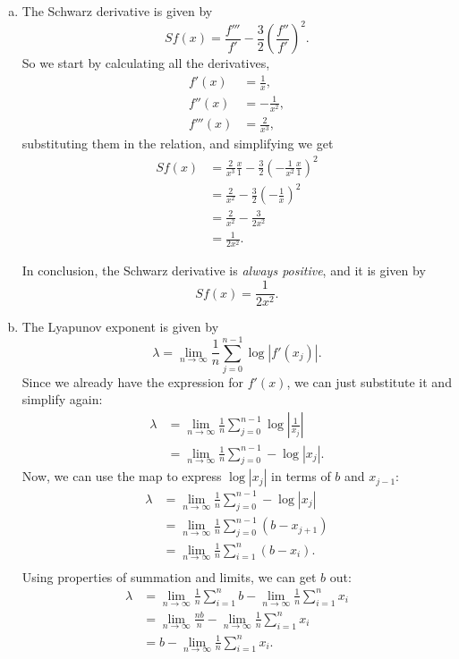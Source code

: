 \begin{enumerate}[(a)]
    \item The Schwarz derivative is given by
    \[
        Sf(x) = \frac{f'''}{f'} - \frac{3}{2}\left(\frac{f''}{f'}\right)^2.
    \]
    So we start by calculating all the derivatives,
    \begin{align*}
        f'(x) &= \frac{1}{x}, \\
        f''(x) &= -\frac{1}{x^2}, \\
        f'''(x) &= \frac{2}{x^3},
    \end{align*}
    substituting them in the relation, and simplifying we get
    \begin{align*}
            Sf(x) &= \frac{2}{x^3}\frac{x}{1} - \frac{3}{2}\left(-\frac{1}{x^2}\frac{x}{1}\right)^2 \\
                  &= \frac{2}{x^2} - \frac{3}{2}\left(-\frac{1}{x}\right)^2 \\
                  &= \frac{2}{x^2} - \frac{3}{2x^2} \\
                  &= \frac{1}{2x^2}.
    \end{align*}

    In conclusion, the Schwarz derivative is \textit{always positive}, and it is given by
    \[
        \boxed{
            Sf(x) = \frac{1}{2x^2}.
        }
    \]

    \item The Lyapunov exponent is given by
    \[
        \lambda = \lim_{n\to\infty}\frac{1}{n}\sum_{j=0}^{n-1}\log|f'(x_j)|.
    \]
    Since we already have the expression for $f'(x)$, we can just substitute it and simplify again:
    \begin{align*}
        \lambda &= \lim_{n\to\infty}\frac{1}{n}\sum_{j=0}^{n-1}\log\left|\frac{1}{x_j}\right| \\
                &= \lim_{n\to\infty}\frac{1}{n}\sum_{j=0}^{n-1}-\log|x_j|.
    \end{align*}
    Now, we can use the map to express $\log|x_j|$ in terms of $b$ and $x_{j-1}$:
    \begin{align*}
        \lambda &= \lim_{n\to\infty}\frac{1}{n}\sum_{j=0}^{n-1}-\log|x_j| \\
                &= \lim_{n\to\infty}\frac{1}{n}\sum_{j=0}^{n-1}(b - x_{j+1}) \\
                &= \lim_{n\to\infty}\frac{1}{n}\sum_{i=1}^{n}(b - x_{i}). \\
    \end{align*}
    Using properties of summation and limits, we can get $b$ out:
    \begin{align*}
        \lambda &= \lim_{n\to\infty}\frac{1}{n}\sum_{i=1}^{n}b - \lim_{n\to\infty}\frac{1}{n}\sum_{i=1}^{n}x_i \\
                &= \lim_{n\to\infty}\frac{nb}{n} - \lim_{n\to\infty}\frac{1}{n}\sum_{i=1}^{n}x_i \\
                &= b - \lim_{n\to\infty}\frac{1}{n}\sum_{i=1}^{n}x_i.
    \end{align*}


\end{enumerate}

